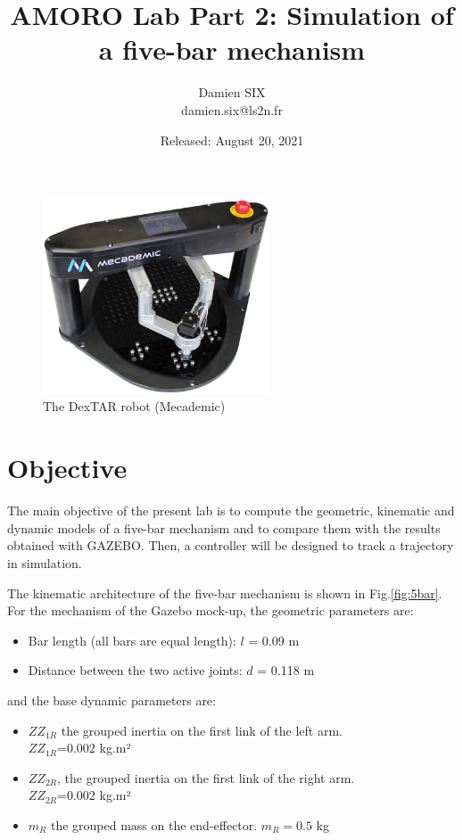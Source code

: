\documentclass[a4paper]{article}
\title{AMORO Lab Part 2: Simulation of a five-bar mechanism}
\author{Damien SIX\\ damien.six@ls2n.fr}
\date{Released: August 20, 2021}
\begin{document}
\maketitle
\begin{figure}[h!]
\centering
\includegraphics[width=0.6\textwidth]{DexTAR_mp.jpg}
\caption{The DexTAR robot (Mecademic)}
\label{fig:DEXTAR}
\end{figure}
\section{Objective}
The main objective of the present lab is to compute the geometric, kinematic and dynamic models of a five-bar mechanism and to compare them with the results obtained with GAZEBO. Then, a controller will be designed to track a trajectory in simulation.

The kinematic architecture of the five-bar mechanism is shown in Fig.\ref{fig:5bar}. For the mechanism of the Gazebo mock-up, the geometric parameters are: 
\begin{itemize}
\item    Bar length (all bars are equal length): $l$ = 0.09 m 
\item    Distance between the two active joints: $d$ = 0.118 m 
\end{itemize}
and the base dynamic parameters are:
\begin{itemize}
    \item $ZZ_{1R}$ the grouped inertia on the first link of the left arm. \\$ZZ_{1R}$=0.002 kg.m²
    \item $ZZ_{2R}$, the grouped inertia on the first link of the right arm. \\$ZZ_{2R}$=0.002 kg.m²
    \item $m_R$ the grouped mass on the end-effector. $m_R=0.5$ kg
\end{itemize}
    
\end{document}
